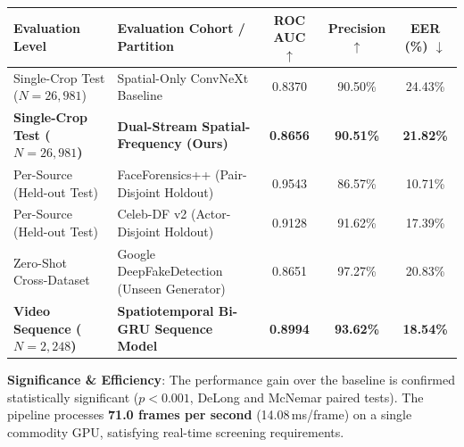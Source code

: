 \documentclass[10pt,a4paper]{article}
\begin{document}
\vspace{0.6ex}
\noindent
\begin{minipage}{\textwidth}
\centering
\small
\begin{tabular}{llccc}
\toprule
\textbf{Evaluation Level} & \textbf{Evaluation Cohort / Partition} & \textbf{ROC AUC} $\uparrow$ & \textbf{Precision} $\uparrow$ & \textbf{EER (\%)} $\downarrow$ \\
\midrule
Single-Crop Test ($N = 26,981$) & Spatial-Only ConvNeXt Baseline & 0.8370 & 90.50\% & 24.43\% \\
\textbf{Single-Crop Test ($N = 26,981$)} & \textbf{Dual-Stream Spatial-Frequency (Ours)} & \textbf{0.8656} & \textbf{90.51\%} & \textbf{21.82\%} \\
\midrule
Per-Source (Held-out Test) & FaceForensics++ (Pair-Disjoint Holdout) & 0.9543 & 86.57\% & 10.71\% \\
Per-Source (Held-out Test) & Celeb-DF v2 (Actor-Disjoint Holdout) & 0.9128 & 91.62\% & 17.39\% \\
Zero-Shot Cross-Dataset & Google DeepFakeDetection (Unseen Generator) & 0.8651 & 97.27\% & 20.83\% \\
\midrule
\textbf{Video Sequence ($N = 2,248$)} & \textbf{Spatiotemporal Bi-GRU Sequence Model} & \textbf{0.8994} & \textbf{93.62\%} & \textbf{18.54\%} \\
\bottomrule
\end{tabular}
\end{minipage}

\vspace{1.2ex}
\noindent
\textbf{Significance \& Efficiency}: The performance gain over the baseline is confirmed statistically significant ($p < 0.001$, DeLong and McNemar paired tests). The pipeline processes \textbf{71.0 frames per second} (14.08\,ms/frame) on a single commodity GPU, satisfying real-time screening requirements.
\end{document}
